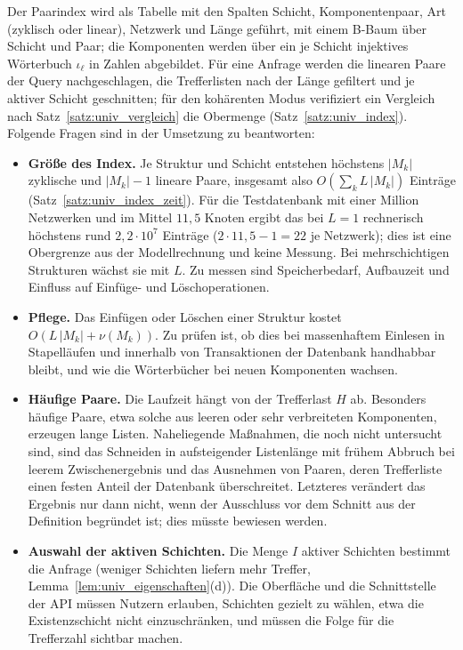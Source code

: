 \documentclass[a4paper,12pt, twoside]{report}
\theoremstyle{definition}
\begin{document}
Der Paarindex wird als Tabelle mit den Spalten Schicht, Komponentenpaar, Art (zyklisch oder linear), Netzwerk und Länge geführt, mit einem B-Baum über Schicht und Paar; die Komponenten werden über ein je Schicht injektives Wörterbuch $\iota_\ell$ in Zahlen abgebildet. Für eine Anfrage werden die linearen Paare der Query nachgeschlagen, die Trefferlisten nach der Länge gefiltert und je aktiver Schicht geschnitten; für den kohärenten Modus verifiziert ein Vergleich nach Satz~\ref{satz:univ_vergleich} die Obermenge (Satz~\ref{satz:univ_index}). Folgende Fragen sind in der Umsetzung zu beantworten:
\begin{itemize}
	\item \textbf{Größe des Index.} Je Struktur und Schicht entstehen höchstens $|M_k|$ zyklische und $|M_k|-1$ lineare Paare, insgesamt also $O(\sum_k L\,|M_k|)$ Einträge (Satz~\ref{satz:univ_index_zeit}). Für die Testdatenbank mit einer Million Netzwerken und im Mittel $11{,}5$ Knoten ergibt das bei $L=1$ rechnerisch höchstens rund $2{,}2\cdot10^{7}$ Einträge ($2\cdot 11{,}5-1=22$ je Netzwerk); dies ist eine Obergrenze aus der Modellrechnung und keine Messung. Bei mehrschichtigen Strukturen wächst sie mit $L$. Zu messen sind Speicherbedarf, Aufbauzeit und Einfluss auf Einfüge- und Löschoperationen.
	\item \textbf{Pflege.} Das Einfügen oder Löschen einer Struktur kostet $O(L\,|M_k|+\nu(M_k))$. Zu prüfen ist, ob dies bei massenhaftem Einlesen in Stapelläufen und innerhalb von Transaktionen der Datenbank handhabbar bleibt, und wie die Wörterbücher bei neuen Komponenten wachsen.
	\item \textbf{Häufige Paare.} Die Laufzeit hängt von der Trefferlast $H$ ab. Besonders häufige Paare, etwa solche aus leeren oder sehr verbreiteten Komponenten, erzeugen lange Listen. Naheliegende Maßnahmen, die noch nicht untersucht sind, sind das Schneiden in aufsteigender Listenlänge mit frühem Abbruch bei leerem Zwischenergebnis und das Ausnehmen von Paaren, deren Trefferliste einen festen Anteil der Datenbank überschreitet. Letzteres verändert das Ergebnis nur dann nicht, wenn der Ausschluss vor dem Schnitt aus der Definition begründet ist; dies müsste bewiesen werden.
	\item \textbf{Auswahl der aktiven Schichten.} Die Menge $I$ aktiver Schichten bestimmt die Anfrage (weniger Schichten liefern mehr Treffer, Lemma~\ref{lem:univ_eigenschaften}(d)). Die Oberfläche und die Schnittstelle der API müssen Nutzern erlauben, Schichten gezielt zu wählen, etwa die Existenzschicht nicht einzuschränken, und müssen die Folge für die Trefferzahl sichtbar machen.
\end{itemize}
\end{document}
